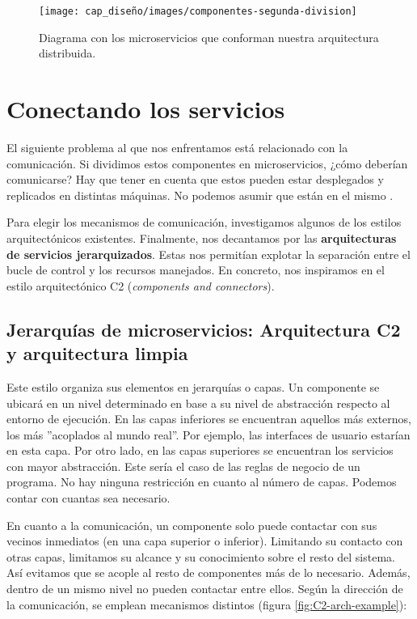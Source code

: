 \begin{figure}[htb]
  \centering
  \texttt{[image: cap\_diseño/images/componentes-segunda-division]}
  \caption{Diagrama con los microservicios que conforman nuestra arquitectura distribuida.}
  \label{fig:mape-k-microservices}
\end{figure}

\section{Conectando los servicios}

El siguiente problema al que nos enfrentamos está relacionado con la comunicación. Si dividimos estos componentes en microservicios, ¿cómo deberían comunicarse? Hay que tener en cuenta que estos pueden estar desplegados y replicados en distintas máquinas. No podemos asumir que están en el mismo .

Para elegir los mecanismos de comunicación, investigamos algunos de los estilos arquitectónicos existentes. Finalmente, nos decantamos por las \textbf{arquitecturas de servicios jerarquizados}. Estas nos permitían explotar la separación entre el bucle de control y los recursos manejados. En concreto, nos inspiramos en el estilo arquitectónico C2 (\emph {components and connectors})\cite{taylorComponentMessagebasedArchitectural1996a, UCISoftwareArchitecture}.

\subsection{Jerarquías de microservicios: Arquitectura C2 y arquitectura limpia}

Este estilo organiza sus elementos en jerarquías o capas. Un componente se ubicará en un nivel determinado en base a su nivel de abstracción respecto al entorno de ejecución. En las capas inferiores se encuentran aquellos más externos, los más ''acoplados al mundo real''. Por ejemplo, las interfaces de usuario estarían en esta capa. Por otro lado, en las capas superiores se encuentran los servicios con mayor abstracción. Este sería el caso de las reglas de negocio de un programa. No hay ninguna restricción en cuanto al número de capas. Podemos contar con cuantas sea necesario.

En cuanto a la comunicación, un componente solo puede contactar con sus vecinos inmediatos (en una capa superior o inferior). Limitando su contacto con otras capas, limitamos su alcance y su conocimiento sobre el resto del sistema. Así evitamos que se acople al resto de componentes más de lo necesario. Además, dentro de un mismo nivel no pueden contactar entre ellos. Según la dirección de la comunicación, se emplean mecanismos distintos (figura \ref{fig:C2-arch-example}):

